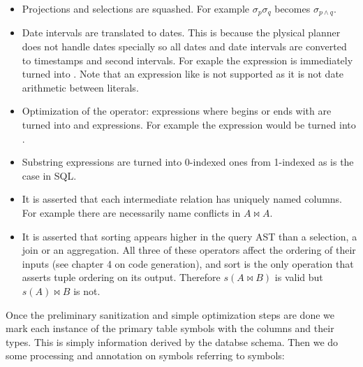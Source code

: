 \begin{itemize}
\item Projections and selections are squashed. For example
  \(\sigma_p\sigma_q\) becomes \(\sigma_{p \land q}\).
\item Date intervals are translated to dates. This is because the plysical
  planner does not handle dates specially so all dates and date
  intervals are converted to timestamps and second intervals. For
  exaple the expression  is
  immediately turned into . Note that an expression
  like  is not supported as it is
  not date arithmetic between literals.
\item Optimization of the  operator:  expressions where 
  begins or ends with \sql{\%} are turned into  and
   expressions. For example the expression  would be turned into .
\item Substring expressions are turned into 0-indexed ones from
  1-indexed as is the case in SQL.
\item It is asserted that each intermediate relation has uniquely named
  columns. For example there are necessarily name conflicts in \(A
  \Join A\).
\item It is asserted that sorting appears higher in the query AST than a
  selection, a join or an aggregation. All three of these operators
  affect the ordering of their inputs (see chapter 4 on code
  generation), and sort is the only operation that asserts tuple
  ordering on its output. Therefore \(s(A \Join B)\) is valid but
  \(s(A) \Join B\) is not.
\end{itemize}

Once the preliminary sanitization and simple optimization steps are
done we mark each instance of the primary table symbols with the
columns and their types. This is simply information derived by the
databse schema. Then we do some processing and annotation on symbols
referring to symbols:

